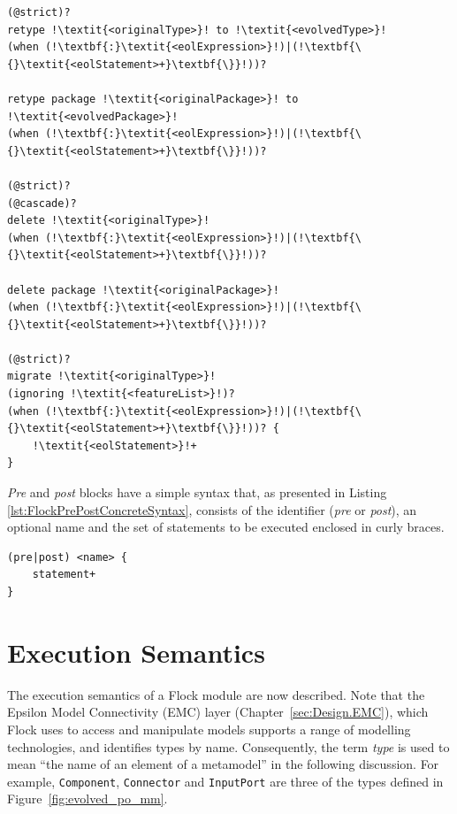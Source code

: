 \begin{lstlisting}[caption={Concrete syntax of Flock retypings, deletions and migrate rules}, label=lst:FlockConcreteSyntax, language=Flock, escapechar=!]
(@strict)?
retype !\textit{<originalType>}! to !\textit{<evolvedType>}!
(when (!\textbf{:}\textit{<eolExpression>}!)|(!\textbf{\{}\textit{<eolStatement>+}\textbf{\}}!))?

retype package !\textit{<originalPackage>}! to !\textit{<evolvedPackage>}!
(when (!\textbf{:}\textit{<eolExpression>}!)|(!\textbf{\{}\textit{<eolStatement>+}\textbf{\}}!))?

(@strict)?
(@cascade)?
delete !\textit{<originalType>}!
(when (!\textbf{:}\textit{<eolExpression>}!)|(!\textbf{\{}\textit{<eolStatement>+}\textbf{\}}!))?

delete package !\textit{<originalPackage>}!
(when (!\textbf{:}\textit{<eolExpression>}!)|(!\textbf{\{}\textit{<eolStatement>+}\textbf{\}}!))?

(@strict)?
migrate !\textit{<originalType>}!
(ignoring !\textit{<featureList>}!)?
(when (!\textbf{:}\textit{<eolExpression>}!)|(!\textbf{\{}\textit{<eolStatement>+}\textbf{\}}!))? {
	!\textit{<eolStatement>}!+
}
\end{lstlisting}

\emph{Pre} and \emph{post} blocks have a simple syntax that, as presented in Listing \ref{lst:FlockPrePostConcreteSyntax}, consists of the identifier (\emph{pre} or \emph{post}), an optional name and the set of statements to be executed enclosed in curly braces.

\begin{lstlisting}[caption=Concrete Syntax of Pre and Post blocks, label=lst:FlockPrePostConcreteSyntax, language=Flock]
(pre|post) <name> {
	statement+
}
\end{lstlisting}

\section{Execution Semantics}
The execution semantics of a Flock module are now described. Note that the Epsilon Model Connectivity (EMC) layer (Chapter~\ref{sec:Design.EMC}), which Flock uses to access and manipulate models supports a range of modelling technologies, and identifies types by name. Consequently, the term \emph{type} is used to mean ``the name of an element of a metamodel'' in the following discussion. For example, \texttt{Co\-mp\-on\-e\-nt}, \texttt{Co\-nn\-ec\-t\-or} and \texttt{In\-p\-utPo\-rt} are three of the types defined in Figure~\ref{fig:evolved_po_mm}.

